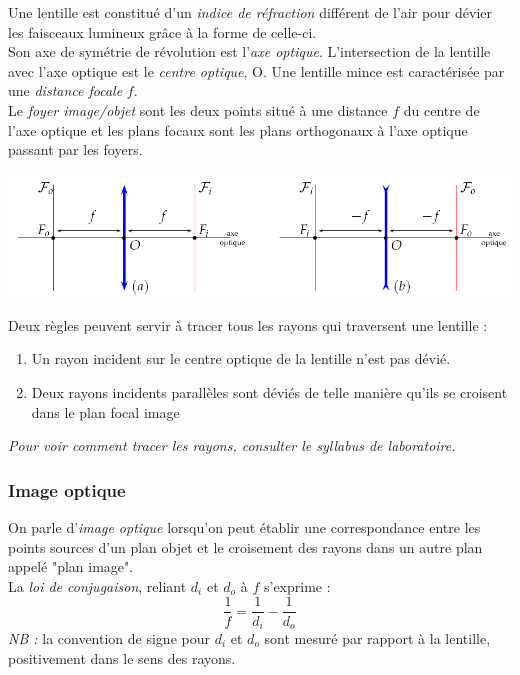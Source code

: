 \documentclass	[11pt, a4paper, openany]{book}
\begin{document}
Une lentille est constitué d'un \textit{indice de réfraction} différent de l'air pour dévier les faisceaux lumineux grâce à la forme de celle-ci.\\

Son axe de symétrie de révolution est l'\textit{axe optique}. L'intersection de la lentille avec l'axe optique est le \textit{centre optique}, O. Une lentille mince est caractérisée par une \textit{distance focale} $f$.\\
Le \textit{foyer image/objet} sont les deux points situé à une distance $f$ du centre de l'axe optique et les plans focaux sont les plans orthogonaux à l'axe optique passant par les foyers.
\begin{center}
\includegraphics[scale=0.6]{labo/image28.png}
\end{center}
Deux règles peuvent servir à tracer tous les rayons qui traversent une lentille : 
\begin{enumerate}
\item Un rayon incident sur le centre optique de la lentille n'est pas dévié.
\item Deux rayons incidents parallèles sont déviés de telle manière qu'ils se croisent dans
le plan focal image
\end{enumerate}
\textit{Pour voir comment tracer les rayons, consulter le syllabus de laboratoire.}

\subsubsection*{Image optique}
On parle d'\textit{image optique} lorsqu'on peut établir une correspondance entre les points sources d'un plan objet et le croisement des rayons dans un autre plan appelé "plan image".\\
La \textit{loi de conjugaison}, reliant $d_i$ et $d_o$ à $f$ s'exprime : 
\begin{equation}
\frac{1}{f} = \frac{1}{d_i} - \frac{1}{d_o}
\end{equation}
\textit{NB :} la convention de signe pour $d_i$ et $d_o$ sont mesuré par rapport à la lentille, positivement dans le sens des rayons.\\
\end{document}
